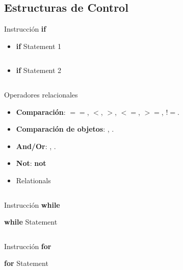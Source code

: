 \documentclass[usenames, dvipsnames, compress]{beamer}
\begin{document}
\subsection{Estructuras de Control}
\begin{frame}[allowframebreaks]{Instrucción \textbf{if}}
	\begin{itemize}
		\item [] \begin{block}{\textbf{if} Statement 1}
			\inputminted[xleftmargin=\parindent,linenos]{python}{codes/if_statement.py}
		\end{block}
		\pause
		\item [] \begin{block}{\textbf{if} Statement 2}
			\inputminted[xleftmargin=\parindent,linenos]{python}{codes/if_statement2.py}
		\end{block}
	\end{itemize}
	\end{frame}
	\begin{frame}{Operadores relacionales}
		\begin{itemize}
			\item \textbf{Comparación}: $==$, $<$, $>$, $<=$, $>=$, $!=$.
			\pause
			\item \textbf{Comparación de objetos}: , 
			.
			\pause
			\item \textbf{And/Or}: , .
			\pause
			\item \textbf{Not}: \textbf{not}
			\pause
			\item [] \begin{block}{Relationals}
				\inputminted[xleftmargin=\parindent,linenos]{python}{codes/relational.py}
			\end{block}
		\end{itemize}
	\end{frame}
	\begin{frame}{Instrucción \textbf{while}}
		\begin{block}{\textbf{while} Statement}
			\inputminted[xleftmargin=\parindent,linenos]{python}{codes/while_statement.py}
		\end{block}
	\end{frame}
	\begin{frame}{Instrucción \textbf{for}}
		\begin{block}{\textbf{for} Statement}
			\inputminted[xleftmargin=\parindent,linenos]{python}{codes/for_statement.py}
		\end{block}
	\end{frame}
\end{document}
